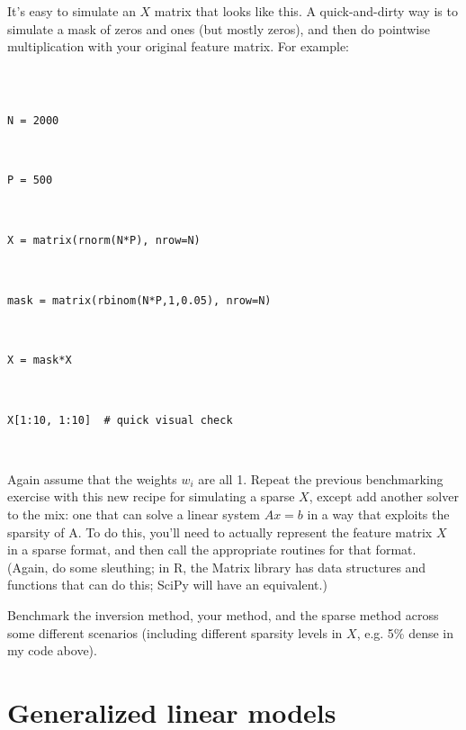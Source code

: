 \documentclass{article}
\begin{document}
\begin{enumerate}[(A)]
It's easy to simulate an $X$ matrix that looks like this.  A quick-and-dirty way is to simulate a mask of zeros and ones (but mostly zeros), and then do pointwise multiplication with your original feature matrix.  For example:



\begin{verbatim}



N = 2000



P = 500



X = matrix(rnorm(N*P), nrow=N)



mask = matrix(rbinom(N*P,1,0.05), nrow=N)



X = mask*X



X[1:10, 1:10]  # quick visual check



\end{verbatim}







Again assume that the weights $w_i$ are all 1.  Repeat the previous benchmarking exercise with this new recipe for simulating a sparse $X$, except add another solver to the mix: one that can solve a linear system $Ax = b$ in a way that exploits the sparsity of A.  To do this, you'll need to actually represent the feature matrix $X$ in a sparse format, and then call the appropriate routines  for that format.  (Again, do some sleuthing; in R, the Matrix library has data structures and functions that can do this; SciPy will have an equivalent.)







Benchmark the inversion method, your method, and the sparse method across some different scenarios (including different sparsity levels in $X$, e.g. 5\% dense in my code above).



\end{enumerate}











\section{Generalized linear models}
\end{document}
